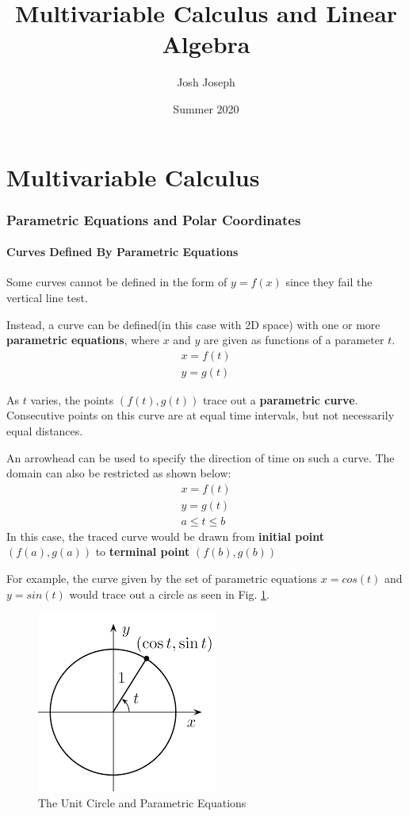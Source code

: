 \documentclass{article}
\title{Multivariable Calculus and Linear Algebra}
\author{Josh Joseph}
\date{Summer 2020}
\begin{document}
\maketitle

\tableofcontents
\newpage
\part{Multivariable Calculus}
\setcounter{section}{10}
\section{Parametric Equations and Polar Coordinates}

\subsection{Curves Defined By Parametric Equations}

Some curves cannot be defined in the form of $y=f(x)$ since they fail the vertical line test.

Instead, a curve can be defined(in this case with 2D space) with one or more \textbf{parametric equations}, where $x$ and $y$ are given as functions of a parameter $t$.
\begin{gather*}
    x=f(t)\\
    y=g(t)
\end{gather*}

As $t$ varies, the points $(f(t),g(t))$ trace out a \textbf{parametric curve}. Consecutive points on this curve are at equal time intervals, but not necessarily equal distances.

An arrowhead can be used to specify the direction of time on such a curve. The domain can also be restricted as shown below:
\begin{gather*}
    x=f(t)\\
    y=g(t)\\
    a \leqslant t \leqslant b
\end{gather*}
In this case, the traced curve would be drawn from \textbf{initial point} $(f(a),g(a))$ to \textbf{terminal point} $(f(b),g(b))$

For example, the curve given by the set of parametric equations $x=cos(t)$ and $y=sin(t)$ would trace out a circle as seen in Fig. \ref{unitcirc}. \\
\begin{figure}[H]
\begin{center}
\includegraphics[scale=0.5]{UnitCircle.png}
\caption{The Unit Circle and Parametric Equations}
\label{unitcirc}
\end{center}
\end{figure}
\end{document}
